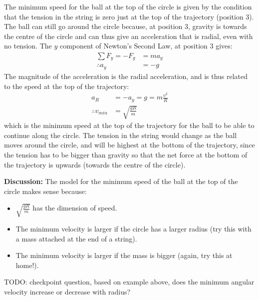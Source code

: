 \begin{example}
The minimum speed for the ball at the top of the circle is given by the condition that the tension in the string is zero just at the top of the trajectory (position 3). The ball can still go around the circle because, at position 3, gravity is towards the centre of the circle and can thus give an acceleration that is radial, even with no tension. The $y$ component of Newton's Second Law, at position 3 gives:
\begin{align*}
\sum F_y = -F_g &= ma_y\\
\therefore a_y &=-g
\end{align*}
The magnitude of the acceleration is the radial acceleration, and is thus related to the speed at the top of the trajectory:
\begin{align*}
a_R&=-a_y=g = m\frac{v^2}{R}\\
\therefore v_{min}&=\sqrt{\frac{gR}{m}}
\end{align*}
which is the minimum speed at the top of the trajectory for the ball to be able to continue along the circle. The tension in the string would change as the ball moves around the circle, and will be highest at the bottom of the trajectory, since the tension has to be bigger than gravity so that the net force at the bottom of the trajectory is upwards (towards the centre of the circle).

\textbf{Discussion:} The model for the minimum speed of the ball at the top of the circle makes sense because:
\begin{itemize}
\item $\sqrt{\frac{gR}{m}}$ has the dimension of speed.
\item The minimum velocity is larger if the circle has a larger radius (try this with a mass attached at the end of a string). 
\item The minimum velocity is larger if the mass is bigger (again, try this at home!). 
\end{itemize}
\end{example}

TODO: checkpoint question, based on example above, does the minimum angular velocity increase or decrease with radius?

